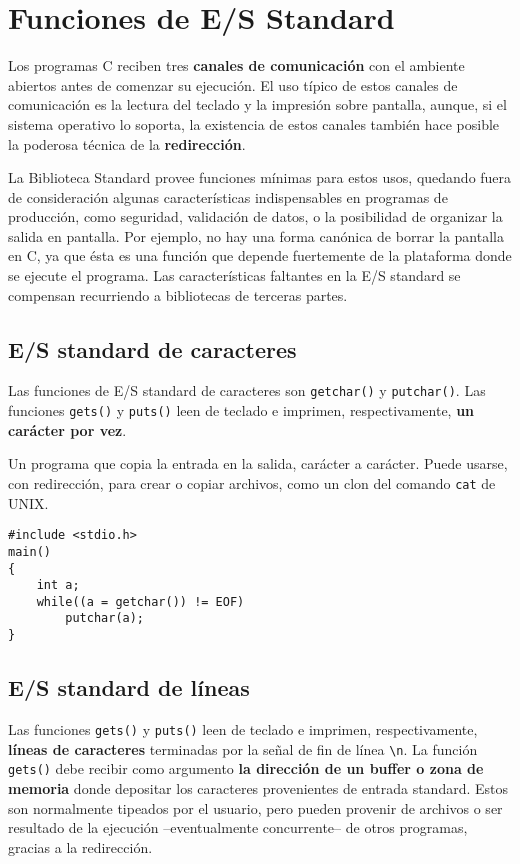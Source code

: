 \section{Funciones de E/S Standard}
\label{sec:esstandard}
Los programas C reciben tres \textbf{canales de comunicación} con el ambiente abiertos
antes de comenzar su ejecución. El uso típico de estos canales de comunicación
es la lectura del teclado y la impresión sobre pantalla, aunque, si el sistema
operativo lo soporta, la existencia de estos canales también hace posible la poderosa técnica de la
\textbf{redirección}. 


La Biblioteca Standard provee funciones mínimas para estos usos,
quedando fuera de consideración algunas características indispensables en
programas de producción, como seguridad, validación de datos, o la posibilidad de
organizar la salida en pantalla. Por ejemplo, no hay una forma canónica de
borrar la pantalla en C, ya que ésta es una función que depende fuertemente de
la plataforma donde se ejecute el programa. Las características faltantes en la
E/S standard se compensan recurriendo a bibliotecas de terceras partes.

\subsection{E/S standard de caracteres}
\label{subsec:esstandardcaract}
Las funciones de E/S standard de caracteres son \lstinline{getchar()} y \lstinline{putchar()}. Las funciones \lstinline{gets()} y \lstinline{puts()} leen de teclado e imprimen, respectivamente, \textbf{un carácter por vez}.

\begin{ejemplo}
Un programa que copia la entrada en la salida, carácter a
carácter. Puede usarse, con redirección, para crear o copiar archivos, como un
clon del comando \lstinline{cat} de UNIX.

\begin{lstlisting}
#include <stdio.h>
main()
{
    int a;
    while((a = getchar()) != EOF)
        putchar(a);
}
\end{lstlisting}
\end{ejemplo}

\subsection{E/S standard de líneas}
\label{subsec:esstandardlineas}
Las funciones \lstinline{gets()} y \lstinline{puts()} leen de teclado e imprimen, respectivamente,
\textbf{líneas de caracteres} terminadas por la señal de fin de línea \lstinline{\n}. La función
\lstinline{gets()} debe recibir como argumento \textbf{la dirección de un buffer o zona de memoria}
donde depositar los caracteres provenientes de entrada standard. Estos son
normalmente tipeados por el usuario, pero pueden provenir de archivos o ser
resultado de la ejecución --eventualmente concurrente-- de otros programas,
gracias a la redirección. 

